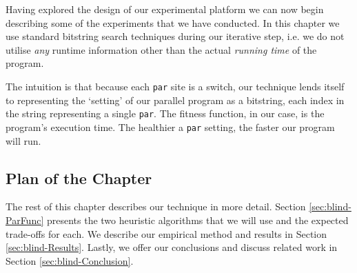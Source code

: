 Having explored the design of our experimental platform we can now begin
describing some of the experiments that we have conducted. In this chapter we
use standard bitstring search techniques during our iterative step, i.e. we do
not utilise \emph{any} runtime information other than the actual \emph{running
time} of the program.

The intuition is that because each \verb|par| site is a switch, our technique
lends itself to representing the `setting' of our parallel program as a
bitstring, each index in the string representing a single \verb|par|. The
fitness function, in our case, is the program's execution time. The healthier a
\verb|par| setting, the faster our program will run.

\subsection*{Plan of the Chapter}

The rest of this chapter describes our technique in more detail. Section
\ref{sec:blind-ParFunc} presents the two heuristic algorithms that we will use
and the expected trade-offs for each. We describe our empirical method and
results in Section \ref{sec:blind-Results}. Lastly, we offer our conclusions
and discuss related work in Section \ref{sec:blind-Conclusion}.
